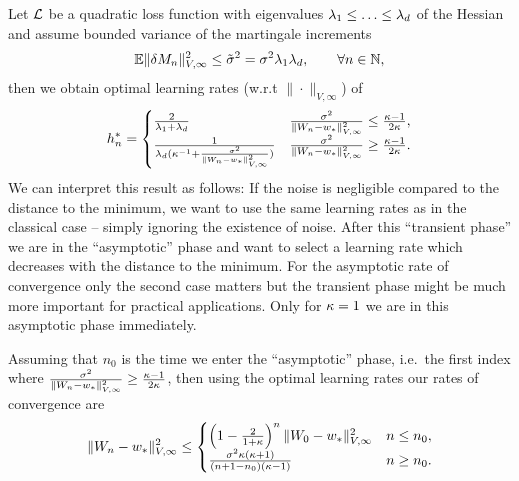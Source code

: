 \begin{theorem}\label{thm: optimal rates quadratic case}
	Let \(\mathcal{L}\) be a quadratic loss function with eigenvalues
	\(\lambda_1\le\ldots\le\lambda_d\) of the Hessian and assume
	bounded variance of the martingale increments
	\begin{align*}
		\mathbb{E}\|\delta M_n\|_{V,\infty}^2
		\le \tilde{\sigma}^2 = \sigma^2 \lambda_1\lambda_d,
		\qquad \forall n\in\mathbb{N},
	\end{align*}
	then we obtain optimal learning rates (w.r.t \(\|\cdot\|_{V,\infty}\)) of
	\begin{align*}
		h_n^*
		= \begin{cases}
			\frac{2}{\lambda_1+\lambda_d}
			& \frac{\sigma^2}{\|W_n - w_*\|_{V,\infty}^2}
			\le \frac{\kappa-1}{2\kappa}, \\
			\frac1{\lambda_d(\kappa^{-1} + \frac{\sigma^2}{\|W_n-w_*\|_{V,\infty}^2})}
			& \frac{\sigma^2}{\|W_n - w_*\|_{V,\infty}^2}
			\ge \frac{\kappa-1}{2\kappa}.
		\end{cases}
	\end{align*}
	We can interpret this result as follows: If the noise is negligible compared to the
	distance to the minimum, we want to use the same learning rates as in the
	classical case -- simply ignoring the existence of noise. After this ``transient
	phase'' we are in the ``asymptotic'' phase and want to select a learning rate
	which decreases with the distance to the minimum. For the asymptotic rate of
	convergence only the second case matters but the transient phase might be much
	more important for practical applications. Only for \(\kappa=1\) we are
	in this asymptotic phase immediately.
	
	Assuming that \(n_0\) is the time we enter the ``asymptotic'' phase,
	i.e.\ the first index where \(\frac{\sigma^2}{\|W_n -
	w_*\|_{V,\infty}^2} \ge
	\frac{\kappa-1}{2\kappa}\),
	then using the optimal learning rates our rates of convergence are
	\begin{align*}
		\|W_n-w_*\|_{V,\infty}^2
		\le \begin{cases}
			\left(1-\tfrac{2}{1+\kappa}\right)^n\|W_0-w_*\|_{V,\infty}^2
			& n \le n_0,\\
			\frac{\sigma^2\kappa(\kappa+1)}{(n+1-n_0)(\kappa-1)}
			& n \ge n_0.
		\end{cases}
	\end{align*}
\end{theorem}
